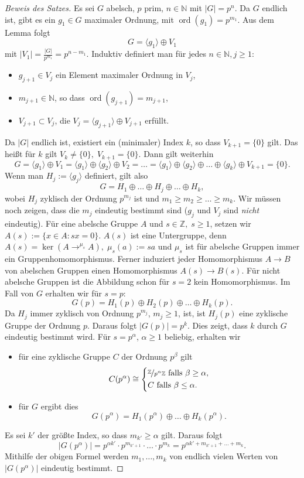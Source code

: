 \documentclass[12pt]{scrartcl} %
\DeclareMathOperator{\ord}{ord}
\theoremstyle{definition}
\theoremstyle{remark}
\begin{document}
\begin{proof}[Beweis des Satzes]
	Es sei $G$ abelsch, $p$ prim, $n\in\mathbb{N}$ mit $|G|=p^n$. Da $G$ endlich ist, gibt es ein $g_1\in G$ maximaler Ordnung, mit $\ord(g_1)=p^{m_1}$. Aus dem Lemma folgt
	\[ G=\langle g_1\rangle\oplus V_1 \]
	mit $|V_1|=\frac{|G|}{p^{m_1}}=p^{n-m_1}$. Induktiv definiert man für jedes $n\in\mathbb{N},j\geq 1$:
	\begin{itemize}
		\item $g_{j+1}\in V_j$ ein Element maximaler Ordnung in $V_j$,
		\item $m_{j+1}\in\mathbb{N}$, so dass $\ord(g_{j+1})=m_{j+1}$,
		\item $V_{j+1}\subset V_j$, die $V_j=\langle g_{j+1}\rangle\oplus V_{j+1}$ erfüllt.
	\end{itemize}
	Da $|G|$ endlich ist, existiert ein (minimaler) Index $k$, so dass $V_{k+1}=\{0\}$ gilt. Das heißt für $k$ gilt $V_k\neq \{0\},\; V_{k+1}=\{0\}$. Dann gilt weiterhin
	\[ G = \langle g_1\rangle\oplus V_1 = \langle g_1\rangle\oplus\langle g_2\rangle\oplus V_2 = \dots = \langle g_1\rangle\oplus\langle g_2\rangle\oplus\dots\oplus\langle g_k\rangle\oplus V_{k+1}=\{0\}.\]
	Wenn man $H_j:=\langle g_j\rangle$ definiert, gilt also
	\[ G = H_1\oplus\dots\oplus H_j\oplus\dots\oplus H_k,\]
	wobei $H_j$ zyklisch der Ordnung $p^{m_j}$ ist und $m_1\geq m_2\geq\dots\geq m_k$. Wir müssen noch zeigen, dass die $m_j$ eindeutig bestimmt sind ($g_j$ und $V_j$ sind \emph{nicht} eindeutig). Für eine abelsche Gruppe $A$ und $s\in\mathbb{Z},\; s\geq 1$, setzen wir $A(s) := \{x\in A:sx=0\}$. $A(s)$ ist eine Untergruppe, denn $A(s) = \ker(A\to^{\mu_s}A),\;\mu_s(a):=sa$ und $\mu_s$ ist für abelsche Gruppen immer ein Gruppenhomomorphismus. Ferner induziert jeder Homomorphismus $A\to B$ von abelschen Gruppen einen Homomorphismus $A(s)\to B(s)$. Für nicht abelsche Gruppen ist die Abbildung schon für $s=2$ kein Homomorphismus. Im Fall von $G$ erhalten wir für $s=p$:
	\[ G(p) = H_1(p)\oplus H_2(p)\oplus\dots\oplus H_k(p).\]
	Da $H_j$ immer zyklisch von Ordnung $p^{m_j}$, $m_j\geq 1$, ist, ist $H_j(p)$ eine zyklische Gruppe der Ordnung $p$. Daraus folgt $|G(p)|=p^k$. Dies zeigt, dass $k$ durch $G$ eindeutig bestimmt wird. Für $s=p^{\alpha}$, $\alpha\geq 1$ beliebig, erhalten wir
	\begin{itemize}
		\item für eine zyklische Gruppe $C$ der Ordnung $p^{\beta}$ gilt
			\[ C(p^{\alpha})\cong \begin{dcases}
 				\nicefrac{\mathbb{Z}}{p^{\alpha}\mathbb{Z}}\text{ falls $\beta\geq\alpha$,} \\
 				C\text{ falls $\beta\leq\alpha$.}
 \end{dcases}\]
		\item für $G$ ergibt dies
			\[G(p^{\alpha})=H_1(p^{\alpha})\oplus\dots\oplus H_k(p^{\alpha}).\]
	\end{itemize}
	Es sei $k'$ der größte Index, so dass $m_{k'}\geq\alpha$ gilt. Daraus folgt
	\[|G(p^{\alpha})|=p^{\alpha k'}\cdot p^{m_{k'+1}}\cdot\dots\cdot p^{m_k} = p^{\alpha k'+m_{k'+1}+\dots+m_k}.\]
	Mithilfe der obigen Formel werden $m_1,\dots,m_k$ von endlich vielen Werten von $|G(p^{\alpha})|$ eindeutig bestimmt.
	

\end{proof}
\end{document}
